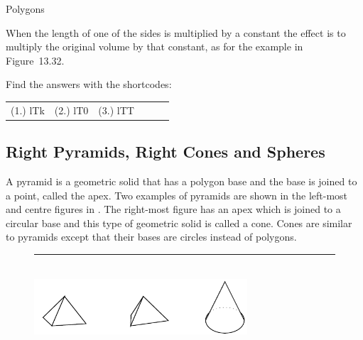 \begin{exercises}{Polygons}
{\begin{mdframed}[linewidth=4, leftmargin=40, rightmargin=40]
\begin{exercise}
    \end{exercise}
    \end{mdframed}
    }
    \noindent
  
        \label{m39357*id64533}When the length of one of the sides is multiplied by a constant the effect is to multiply the original volume by that constant, as for the example in Figure~13.32.\par 
      
    

  \label{m39357*cid323}
\par {} Find the answers with the shortcodes:
 \par \begin{tabular}[h]{cccccc}
 (1.) lTk  &  (2.) lT0  &  (3.) lTT  & \end{tabular}



            \subsection{ Right Pyramids, Right Cones and Spheres}
            \nopagebreak
            
      
      \label{m39357*id62623}A pyramid is a geometric solid that has a polygon base and the base is joined to a point, called the apex. Two examples of pyramids are shown in the left-most and centre figures in . The right-most figure has an apex which is joined to a circular base and this type of geometric solid is called a cone. Cones are similar to pyramids except that their bases are circles instead of polygons.\par 
      
    \setcounter{subfigure}{0}


	\begin{figure}[H] %
    \begin{center}
    \rule[.1in]{\figurerulewidth}{.005in} \\
        \label{m39357*uid676!!!underscore!!!media}\label{m39357*uid676!!!underscore!!!printimage}\includegraphics[width=300px]{col11306.imgs/m39357_MG11C16_001.png} %
        

\end{center}
\end{figure}
\end{exercises}
